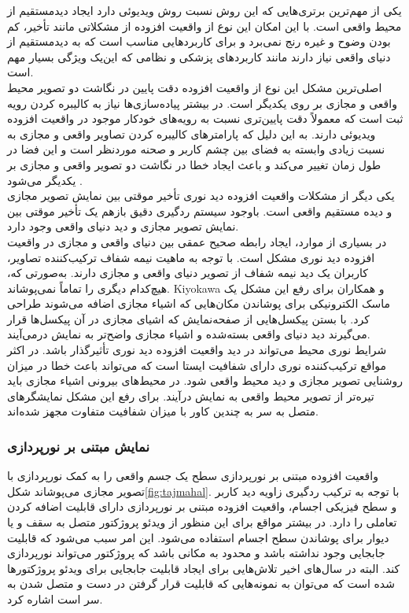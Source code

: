 یکی از مهم‌ترین برتری‌هایی که این روش نسبت روش ویدیوئی دارد ایجاد دیدمستقیم از محیط واقعی است. با این امکان این نوع از واقعیت افزوده از مشکلاتی مانند تأخیر، کم بودن وضوح و غیره رنج نمی‌برد و برای کاربردهایی مناسب است که به دیدمستقیم از دنیای واقعی نیاز دارند مانند کاربردهای پزشکی و نظامی که این‌یک ویژگی بسیار مهم است.
\\
اصلی‌ترین مشکل این نوع از واقعیت افزوده دقت پایین در نگاشت دو تصویر محیط واقعی و مجازی بر روی یکدیگر است. در بیشتر پیاده‌سازی‌ها نیاز به کالیبره کردن رویه ثبت است که معمولاً دقت پایین‌تری نسبت به رویه‌های خودکار موجود در واقعیت افزوده ویدیوئی دارند. به این دلیل که پارامترهای کالیبره کردن تصاویر واقعی و مجازی به نسبت زیادی وابسته به فضای بین چشم کاربر و صحنه موردنظر است و این فضا در طول زمان تغییر می‌کند و باعث ایجاد خطا در نگاشت دو تصویر واقعی و مجازی بر یکدیگر می‌شود \cite{Billinghurst}.
\\
یکی دیگر از مشکلات واقعیت افزوده دید نوری تأخیر موقتی بین نمایش تصویر مجازی و دیده مستقیم واقعی است. باوجود سیستم ردگیری دقیق بازهم یک تأخیر موقتی بین نمایش تصویر مجازی و دید دنیای واقعی وجود دارد.
\\
در بسیاری از موارد، ایجاد رابطه صحیح عمقی بین دنیای واقعی و مجازی در واقعیت افزوده دید نوری مشکل است. با توجه به ماهیت نیمه شفاف ترکیب‌کننده تصاویر، کاربران یک دید نیمه شفاف از تصویر دنیای واقعی و مجازی دارند. به‌صورتی که، هیچ‌کدام دیگری را تماماً نمی‌پوشاند. Kiyokawa و همکاران\cite{Kiyokawa} برای رفع این مشکل یک ماسک الکترونیکی برای پوشاندن مکان‌هایی که اشیاء مجازی اضافه می‌شوند طراحی کرد. با بستن پیکسل‌هایی از صفحه‌نمایش که اشیای مجازی در آن پیکسل‌ها قرار می‌گیرند دید دنیای واقعی بسته‌شده و اشیاء مجازی واضح‌تر به نمایش درمی‌آیند.
\\
شرایط نوری محیط می‌تواند در دید واقعیت افزوده دید نوری تأثیرگذار باشد. در اکثر مواقع ترکیب‌کننده نوری دارای شفافیت ایستا است که می‌تواند باعث خطا در میزان روشنایی تصویر مجازی و دید محیط واقعی شود. در محیط‌های بیرونی اشیاء مجازی باید تیره‌تر از تصویر محیط واقعی به نمایش درآیند. برای رفع این مشکل نمایشگرهای متصل به سر به چندین کاور با میزان شفافیت متفاوت مجهز شده‌اند.
\subsubsection{نمایش مبتنی بر نورپردازی}
واقعیت افزوده مبتنی بر نورپردازی سطح یک جسم واقعی را به کمک نورپردازی با تصویر مجازی می‌پوشاند شکل\ref{fig:tajmahal}. با توجه به ترکیب ردگیری زاویه دید کاربر و سطح فیزیکی اجسام، واقعیت افزوده مبتنی بر نورپردازی دارای قابلیت اضافه کردن تعاملی را دارد\cite{Raskar}. در بیشتر مواقع برای این منظور از ویدئو پروژکتور متصل به سقف و یا دیوار برای پوشاندن سطح اجسام استفاده می‌شود. این امر سبب می‌شود که قابلیت جابجایی وجود نداشته باشد و محدود به مکانی باشد که پروژکتور می‌تواند نورپردازی کند. البته در سال‌های اخیر تلاش‌هایی برای ایجاد قابلیت جابجایی برای ویدئو پروژکتورها شده است که می‌توان به نمونه‌هایی که قابلیت قرار گرفتن در دست\cite{Mistry} و متصل شدن به سر است\cite{krum2012augmented} اشاره کرد.

